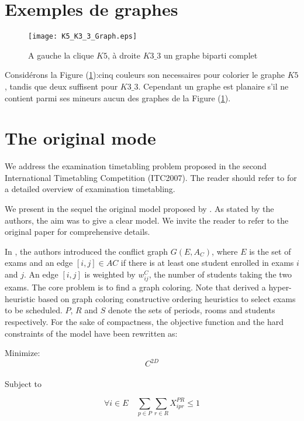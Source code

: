 \documentclass[a4paper,french,10pt]{report}
\begin{document}
\section{Exemples de graphes}
\label{section4}
\begin{figure}[h]
		\centering
		\texttt{[image: K5\_K3\_3\_Graph.eps]}
		\caption{A gauche la clique $K5$, à droite $K3\_ 3$ un graphe biparti complet}
		\label{figure3}
\end{figure}
Considérons la Figure (\ref{figure3}):cinq couleurs son necessaires pour colorier le graphe $K5$, tandis que deux suffisent pour $K3\_3$. Cependant  un graphe est planaire s’il ne contient parmi ses mineurs aucun des graphes de la Figure (\ref{figure3}).


\section{The original mode}
\label{section5}
\noindent We address the examination timetabling problem proposed in the second International Timetabling
Competition (ITC2007). The reader should refer to \cite{burke1997automated} for a detailed overview of examination
timetabling.\par
We present in the sequel the original model
proposed by \cite{springerlink:10.1007/s10479-011-0997-x}. As stated by the authors, the aim was to give a clear model. We invite the reader to refer to the original paper for comprehensive details.\par
In \cite{springerlink:10.1007/s10479-011-0997-x}, the authors introduced the conflict graph $G(E, A_C )$, where $E$ is the set of exams
and an edge $[i, j] \in AC$ if there is at least one student enrolled in exams $i$ and $j$. An edge
$[i, j]$ is weighted by $w^{C}_{ij}$, the number of students taking the two exams. The core problem
is to find a graph coloring. Note that \cite{sabar2012graph} derived a hyper-heuristic based on graph coloring
constructive ordering heuristics to select exams to be scheduled. $P$, $R$ and $S$ denote the
sets of periods, rooms and students respectively. For the sake of compactness, the objective
function and the hard constraints of the model have been rewritten as:\par
Minimize:
	\begin{equation}
	 C^{2D}
	 \label{equation2}
	\end{equation} \\
Subject to \par
	\begin{equation}
	 \forall i\in E\quad\sum_{p\in P}\sum_{r\in R}X^{PR}_{ipr} \leq 1
	\label{equation3}
	\end{equation}
	
\end{document}
